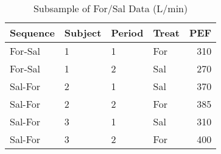 \begin{table}

\caption{\label{tab:forSalData}Subsample of For/Sal Data (L/min)}
\centering
\begin{tabular}[t]{llllr}
\toprule
Sequence & Subject & Period & Treat & PEF\\
\midrule
For-Sal & 1 & 1 & For & 310\\
For-Sal & 1 & 2 & Sal & 270\\
Sal-For & 2 & 1 & Sal & 370\\
Sal-For & 2 & 2 & For & 385\\
Sal-For & 3 & 1 & Sal & 310\\
Sal-For & 3 & 2 & For & 400\\
\bottomrule
\end{tabular}
\end{table}
